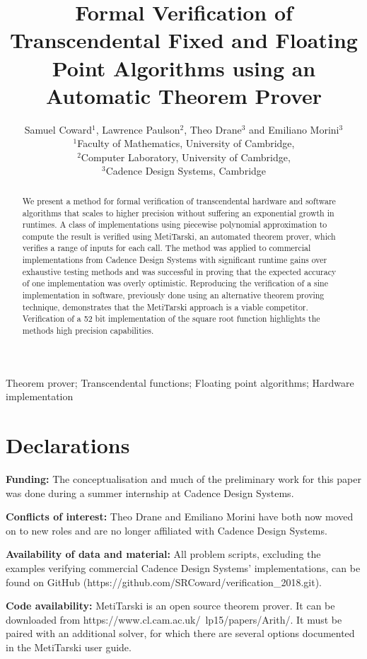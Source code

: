 \documentclass{fac}
\title[Transcendental Verification using Theorem Proving]{Formal Verification of Transcendental Fixed and Floating Point Algorithms using an Automatic Theorem Prover}
\author[Samuel Coward]
    {Samuel Coward$^1$, Lawrence Paulson$^2$, Theo Drane$^3$ and Emiliano Morini$^3$\\
     $^1$Faculty of Mathematics, University of Cambridge,\\
     $^2$Computer Laboratory, University of Cambridge,\\
     $^3$Cadence Design Systems, Cambridge\\}
\begin{document}
\label{firstpage}

\makecorrespond

\maketitle

\begin{abstract}
We present a method for formal verification of transcendental hardware and software algorithms that scales to higher precision without suffering an exponential growth in runtimes. A class of implementations using piecewise polynomial approximation to compute the result is verified using MetiTarski, an automated theorem prover, which verifies a range of inputs for each call. The method was applied to commercial implementations from Cadence Design Systems with significant runtime gains over exhaustive testing methods and was successful in proving that the expected accuracy of one implementation was overly optimistic. Reproducing the verification of a sine implementation in software, previously done using an alternative theorem proving technique, demonstrates that the MetiTarski approach is a viable competitor. Verification of a 52 bit implementation of the square root function highlights the methods high precision capabilities.  
\end{abstract}
\begin{keywords}Theorem prover; Transcendental functions; Floating point algorithms; Hardware implementation
\end{keywords}

\section*{Declarations}
\textbf{Funding:} The conceptualisation and much of the preliminary work for this paper was done during a summer internship at Cadence Design Systems.

\noindent\textbf{Conflicts of interest:} Theo Drane and Emiliano Morini have both now moved on to new roles and are no longer affiliated with Cadence Design Systems. 

\noindent\textbf{Availability of data and material:} All problem scripts, excluding the examples verifying commercial Cadence Design Systems' implementations, can be found on GitHub \newline (https://github.com/SRCoward/verification\_2018.git).

\noindent\textbf{Code availability:} MetiTarski is an open source theorem prover. It can be downloaded from
\newline https://www.cl.cam.ac.uk/~lp15/papers/Arith/. It must be paired with an additional solver, for which there are several options documented in the MetiTarski user guide.
\end{document}
